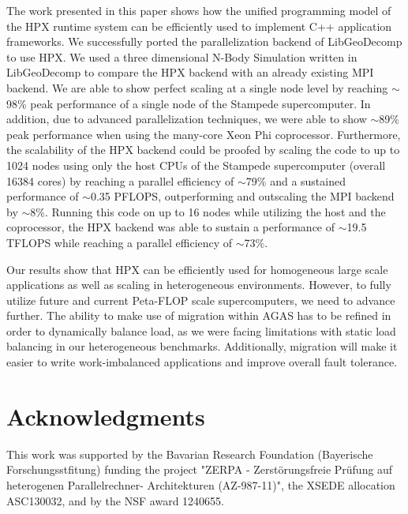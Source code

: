 \documentclass{sig-alternate}
\newcommand{\upp}{\vspace*{-0.5em}}
\newcommand{\up}{\vspace*{-0.25em}}
\begin{document}
The work presented in this paper shows how the unified programming model of the
HPX runtime system can be efficiently used to implement C++ application
frameworks. We successfully ported the parallelization backend of LibGeoDecomp to
use HPX. We used a three dimensional N-Body Simulation written in LibGeoDecomp
to compare the HPX backend with an already existing MPI backend. We are able to
show perfect scaling at a single node level by reaching $\sim$98\% peak
performance of a single node of the Stampede supercomputer. In addition, due to
advanced parallelization techniques, we were able to show $\sim$89\%
peak performance when using the many-core Xeon Phi coprocessor. Furthermore, the
scalability of the HPX backend could be proofed by scaling the code to up to 1024
nodes using only the host CPUs of the Stampede supercomputer (overall 16384 cores) by reaching a
parallel efficiency of $\sim$79\% and a sustained performance of $\sim$0.35
PFLOPS, outperforming and outscaling the MPI backend by $\sim$8\%. Running this code on up to
16 nodes while utilizing the host and the coprocessor, the HPX backend was able to sustain
a performance of $\sim$19.5 TFLOPS while reaching a parallel efficiency of $\sim$73\%.

Our results show that HPX can be efficiently used for homogeneous large scale applications
as well as scaling in heterogeneous environments. However, to fully utilize future and
current Peta-FLOP scale supercomputers, we need to advance further. The ability
to make use of migration within AGAS has to be refined in order to dynamically balance
load, as we were facing limitations with static load balancing in our heterogeneous
benchmarks. Additionally, migration will make it easier to write work-imbalanced applications and improve
overall fault tolerance.

\section{Acknowledgments}

This work was supported by the Bavarian Research Foundation (Bayerische
Forschungsstfitung) funding the project "ZERPA - Zerst\"orungsfreie
Pr\"ufung auf heterogenen Parallelrechner- Architekturen (AZ-987-11)",
the XSEDE allocation ASC130032, and by the NSF award 1240655.

\small


\end{document}
